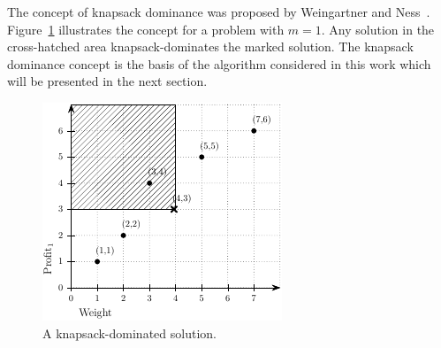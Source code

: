 The concept of knapsack dominance was proposed by Weingartner and Ness~\cite{weingartner1967methods}.
Figure~\ref{fig:kdom} illustrates the concept for a problem with $m = 1$.
Any solution in the cross-hatched area knapsack-dominates the marked solution.
The knapsack dominance concept is the basis of the algorithm considered in this work which will be presented
in the next section.

\begin{figure}
  \centering
  \includegraphics[scale=1.2]{src/imgs/dom}
  \caption{A knapsack-dominated solution.}
  \label{fig:kdom}
\end{figure}

%




